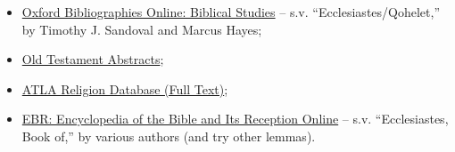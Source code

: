 \documentclass[titlepage]{article}
\begin{document}
\begin{itemize}
\item \href{https://www.oxfordbibliographies.com/display/document/obo-9780195393361/obo-9780195393361-0015.xml#obo-9780195393361-0015-div1-0005}{Oxford Bibliographies Online: Biblical Studies} -- s.v. “Ecclesiastes/Qohelet,” by Timothy J. Sandoval and Marcus Hayes;
\item \href{https://search.ebscohost.com/login.aspx?authtype=ip,shib&custid=s5315951&groupid=main&profile=ehost&defaultdb=ota}{Old Testament Abstracts};
\item \href{https://search.ebscohost.com/login.aspx?authtype=ip,shib&custid=s5315951&groupid=main&profile=ehost&defaultdb=rfh}{ATLA Religion Database (Full Text)};
\item \href{https://go.openathens.net/redirector/astheology.ns.ca?url=https://www.degruyter.com/document/doi/10.1515/ebr/html}{EBR: Encyclopedia of the Bible and Its Reception Online} --
s.v. “Ecclesiastes, Book of,” by various authors (and try other lemmas).
\end{itemize}
\end{document}
